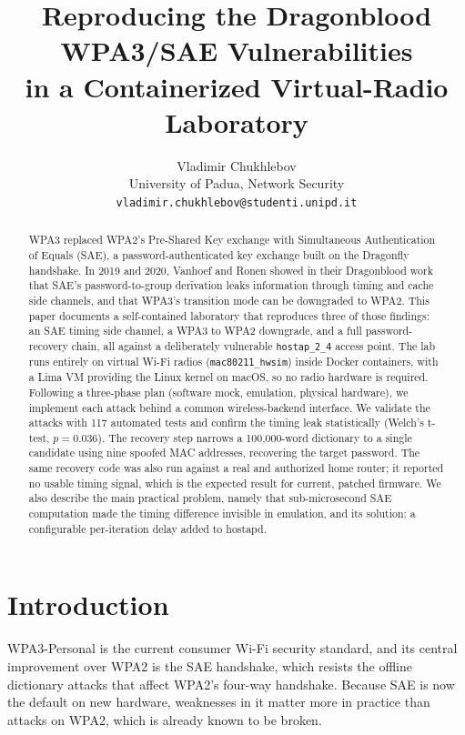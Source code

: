\documentclass[11pt,letterpaper]{article}
\title{Reproducing the Dragonblood WPA3/SAE Vulnerabilities\\
in a Containerized Virtual-Radio Laboratory}
\author{Vladimir Chukhlebov\\
University of Padua, Network Security\\
\texttt{vladimir.chukhlebov@studenti.unipd.it}}
\date{}
\newcommand{\code}[1]{\texttt{\small #1}}
\begin{document}
\maketitle

\begin{abstract}
WPA3 replaced WPA2's Pre-Shared Key exchange with Simultaneous Authentication of
Equals (SAE), a password-authenticated key exchange built on the Dragonfly
handshake. In 2019 and 2020, Vanhoef and Ronen showed in their Dragonblood work
that SAE's password-to-group derivation leaks information through timing and
cache side channels, and that WPA3's transition mode can be downgraded to WPA2.
This paper documents a self-contained laboratory that reproduces three of those
findings: an SAE timing side channel, a WPA3 to WPA2 downgrade, and a full
password-recovery chain, all against a deliberately vulnerable
\code{hostap\_2\_4} access point. The lab runs entirely on virtual Wi-Fi radios
(\code{mac80211\_hwsim}) inside Docker containers, with a Lima VM providing the
Linux kernel on macOS, so no radio hardware is required. Following a three-phase
plan (software mock, emulation, physical hardware), we implement each attack
behind a common wireless-backend interface. We validate the attacks with 117
automated tests and confirm the timing leak statistically (Welch's t-test,
$p = 0.036$). The recovery step narrows a 100,000-word dictionary to a single
candidate using nine spoofed MAC addresses, recovering the target password. The
same recovery code was also run against a real and authorized home router; it
reported no usable timing signal, which is the expected result for current,
patched firmware. We also describe the main
practical problem, namely that sub-microsecond SAE computation made the timing
difference invisible in emulation, and its solution: a configurable per-iteration
delay added to hostapd.
\end{abstract}

\clearpage

\section{Introduction}

WPA3-Personal is the current consumer Wi-Fi security standard, and its central
improvement over WPA2 is the SAE handshake, which resists the offline dictionary
attacks that affect WPA2's four-way handshake. Because SAE is now the default on
new hardware, weaknesses in it matter more in practice than attacks on WPA2,
which is already known to be broken.
\end{document}
